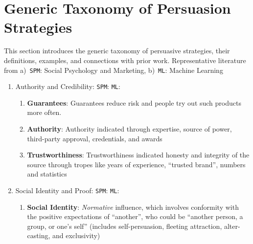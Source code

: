 \documentclass[hidelinks,11pt,a4paper]{report}
\renewcommand{\cite}[1]{\citep{#1}}
\begin{document}
\section{Generic Taxonomy of Persuasion Strategies}
\label{tab:persuasive-strategies-list}
This section introduces the generic taxonomy of persuasive strategies, their definitions, examples, and connections with prior work. Representative literature from a)~\texttt{SPM}: Social Psychology and Marketing, b)~\texttt{ML}: Machine Learning

\begin{enumerate}
    \item Authority and Credibility: \texttt{SPM}:\cite{aronson1963communicator,milgram1978obedience,cialdini2007influence,milgram1963behavioral,mcginnies1980better,giffin1967contribution,petty1986elaboration} \texttt{ML}:\cite{anand2011believe,iyer2019unsupervised,wachsmuth2017computational,ChenYang2021,durmus-cardie-2018-exploring}
    \begin{enumerate}
        \item \textbf{Guarantees}: Guarantees reduce risk and people try out such products more often. 

        \item \textbf{Authority}: Authority indicated through expertise, source of power, third-party approval, credentials, and awards
    
        \item \textbf{Trustworthiness}: Trustworthiness indicated honesty and integrity of the source through tropes like years of experience, ``trusted brand'', numbers and statistics
    \end{enumerate}

    \item Social Identity and Proof: \texttt{SPM}:\cite{deutsch1955study,petty1997attitudes,wood2000attitude,cialdini2004social,levesque2020human} \texttt{ML}: \cite{anand2011believe,iyer2019unsupervised,rosenthal2017detecting,yang2019let,zhang2016inferring,stab2017parsing,althoff2014ask,hidey2017analyzing,durmus-cardie-2018-exploring}

    \begin{enumerate}
        \item \textbf{Social Identity}: \textit{Normative} influence, which involves conformity with the positive expectations of ``another'', who could be ``another person, a group, or one's self'' (includes self-persuasion, fleeting attraction, alter-casting, and exclusivity)


\end{enumerate}
\end{enumerate}
\end{document}
